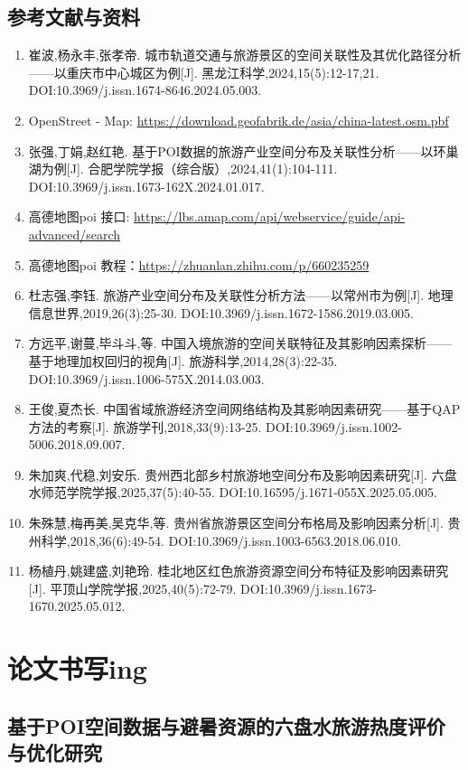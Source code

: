 \subsection*{参考文献与资料}
\begin{enumerate}
  \renewcommand{\labelenumi}{(\alph*)}
  \item 崔波,杨永丰,张孝帝. 城市轨道交通与旅游景区的空间关联性及其优化路径分析——以重庆市中心城区为例[J]. 黑龙江科学,2024,15(5):12-17,21. DOI:10.3969/j.issn.1674-8646.2024.05.003. 
  \item OpenStreet - Map: \url{https://download.geofabrik.de/asia/china-latest.osm.pbf}
  \item 张强,丁娟,赵红艳. 基于POI数据的旅游产业空间分布及关联性分析——以环巢湖为例[J]. 合肥学院学报（综合版）,2024,41(1):104-111. DOI:10.3969/j.issn.1673-162X.2024.01.017.
\item 高德地图poi 接口: \url{https://lbs.amap.com/api/webservice/guide/api-advanced/search}
\item 高德地图poi 教程：\url{https://zhuanlan.zhihu.com/p/660235259}
  \item 杜志强,李钰. 旅游产业空间分布及关联性分析方法——以常州市为例[J]. 地理信息世界,2019,26(3):25-30. DOI:10.3969/j.issn.1672-1586.2019.03.005.
  \item 方远平,谢蔓,毕斗斗,等. 中国入境旅游的空间关联特征及其影响因素探析——基于地理加权回归的视角[J]. 旅游科学,2014,28(3):22-35. DOI:10.3969/j.issn.1006-575X.2014.03.003.
  \item 王俊,夏杰长. 中国省域旅游经济空间网络结构及其影响因素研究——基于QAP方法的考察[J]. 旅游学刊,2018,33(9):13-25. DOI:10.3969/j.issn.1002-5006.2018.09.007.
  \item 朱加爽,代稳,刘安乐. 贵州西北部乡村旅游地空间分布及影响因素研究[J]. 六盘水师范学院学报,2025,37(5):40-55. DOI:10.16595/j.1671-055X.2025.05.005.
  \item 朱殊慧,梅再美,吴克华,等. 贵州省旅游景区空间分布格局及影响因素分析[J]. 贵州科学,2018,36(6):49-54. DOI:10.3969/j.issn.1003-6563.2018.06.010.
  \item 杨植丹,姚建盛,刘艳玲. 桂北地区红色旅游资源空间分布特征及影响因素研究[J]. 平顶山学院学报,2025,40(5):72-79. DOI:10.3969/j.issn.1673-1670.2025.05.012.
\end{enumerate}

\section*{论文书写ing}
\subsection*{基于POI空间数据与避暑资源的六盘水旅游热度评价与优化研究}

